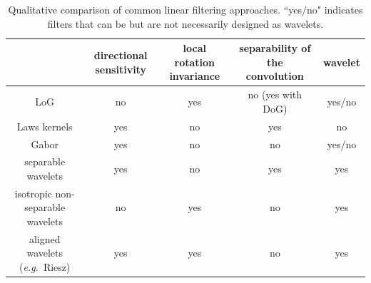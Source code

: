 \documentclass[fleqn,a4paper,oneside,openany]{book}
\begin{document}
\begin{table}\scriptsize
\caption{Qualitative comparison of common linear filtering approaches. ``yes/no" indicates filters that can be but are not necessarily designed as wavelets.}
\label{tab:quantitativeComparison}
\begin{center}
\begin{tabular}{c|cccc|}
 & \begin{minipage}{50pt}\centering\vspace{3pt} directional sensitivity \vspace{3pt}\end{minipage} & \begin{minipage}{60pt}\centering\vspace{3pt} local rotation invariance \vspace{3pt}\end{minipage} & \begin{minipage}{90pt}\centering\vspace{3pt} separability of the convolution\vspace{3pt}\end{minipage} & wavelet \\
\hline
LoG & no & yes & no (yes with DoG) & yes/no \\
\begin{minipage}{50pt}\centering\vspace{3pt} Laws kernels \vspace{3pt}\end{minipage} & yes & no & yes & no \\
\begin{minipage}{50pt}\centering\vspace{3pt} Gabor \vspace{3pt}\end{minipage} & yes & no & no & yes/no \\
\begin{minipage}{50pt}\centering\vspace{3pt} separable wavelets \vspace{3pt}\end{minipage} & yes & no & yes & yes\\
\begin{minipage}{50pt}\centering\vspace{3pt} isotropic non-separable wavelets \vspace{3pt}\end{minipage} & no & yes & no & yes \\
\begin{minipage}{50pt}\centering\vspace{3pt} aligned wavelets \hbox{(\textit{e.g.} Riesz)} \vspace{3pt}\end{minipage} & yes & yes & no & yes \\
\hline
\end{tabular}
\end{center}
\end{table}
%
\end{document}
